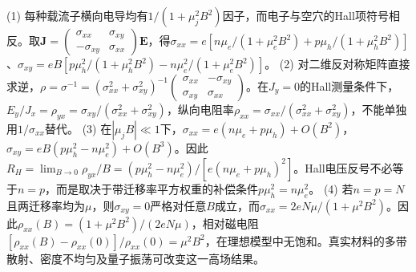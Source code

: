 (1) 每种载流子横向电导均有\(1/(1+\mu_j^2B^2)\)因子，而电子与空穴的Hall项符号相反。取\(\mathbf J=\begin{pmatrix}\sigma_{xx}&\sigma_{xy}\\-\sigma_{xy}&\sigma_{xx}\end{pmatrix}\mathbf E\)，得\(\sigma_{xx}=e[n\mu_e/(1+\mu_e^2B^2)+p\mu_h/(1+\mu_h^2B^2)]\)、\(\sigma_{xy}=eB[p\mu_h^2/(1+\mu_h^2B^2)-n\mu_e^2/(1+\mu_e^2B^2)]\)。
(2) 对二维反对称矩阵直接求逆，\(\rho=\sigma^{-1}=(\sigma_{xx}^2+\sigma_{xy}^2)^{-1}\begin{pmatrix}\sigma_{xx}&-\sigma_{xy}\\\sigma_{xy}&\sigma_{xx}\end{pmatrix}\)。在\(J_y=0\)的Hall测量条件下，\(E_y/J_x=\rho_{yx}=\sigma_{xy}/(\sigma_{xx}^2+\sigma_{xy}^2)\)，纵向电阻率\(\rho_{xx}=\sigma_{xx}/(\sigma_{xx}^2+\sigma_{xy}^2)\)，不能单独用\(1/\sigma_{xx}\)替代。
(3) 在\(|\mu_jB|\ll1\)下，\(\sigma_{xx}=e(n\mu_e+p\mu_h)+O(B^2)\)，\(\sigma_{xy}=eB(p\mu_h^2-n\mu_e^2)+O(B^3)\)。因此\(R_H=\lim_{B\to0}\rho_{yx}/B=(p\mu_h^2-n\mu_e^2)/[e(n\mu_e+p\mu_h)^2]\)。Hall电压反号不必等于\(n=p\)，而是取决于带迁移率平方权重的补偿条件\(p\mu_h^2=n\mu_e^2\)。
(4) 若\(n=p=N\)且两迁移率均为\(\mu\)，则\(\sigma_{xy}=0\)严格对任意\(B\)成立，而\(\sigma_{xx}=2eN\mu/(1+\mu^2B^2)\)。因此\(\rho_{xx}(B)=(1+\mu^2B^2)/(2eN\mu)\)，相对磁电阻\([\rho_{xx}(B)-\rho_{xx}(0)]/\rho_{xx}(0)=\mu^2B^2\)，在理想模型中无饱和。真实材料的多带散射、密度不均匀及量子振荡可改变这一高场结果。
